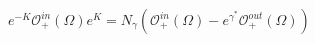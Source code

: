 \begin{equation}
e^{-K}\mathcal{O}^{in}_+(\Omega)
e^K=N_{\gamma}(
\mathcal{O}^{in}_+(\Omega)-
e^{\gamma^*}
\mathcal{O}^{out}_+(\Omega)) \ 
\end{equation}


